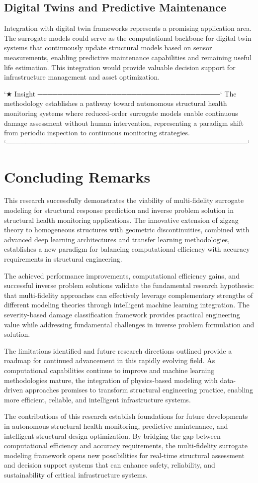 \subsection{Digital Twins and Predictive Maintenance}
Integration with digital twin frameworks represents a promising application area. The surrogate models could serve as the computational backbone for digital twin systems that continuously update structural models based on sensor measurements, enabling predictive maintenance capabilities and remaining useful life estimation. This integration would provide valuable decision support for infrastructure management and asset optimization.

`★ Insight ─────────────────────────────────────`
The methodology establishes a pathway toward autonomous structural health monitoring systems where reduced-order surrogate models enable continuous damage assessment without human intervention, representing a paradigm shift from periodic inspection to continuous monitoring strategies.
`─────────────────────────────────────────────────`

\section{Concluding Remarks}
This research successfully demonstrates the viability of multi-fidelity surrogate modeling for structural response prediction and inverse problem solution in structural health monitoring applications. The innovative extension of zigzag theory to homogeneous structures with geometric discontinuities, combined with advanced deep learning architectures and transfer learning methodologies, establishes a new paradigm for balancing computational efficiency with accuracy requirements in structural engineering.

The achieved performance improvements, computational efficiency gains, and successful inverse problem solutions validate the fundamental research hypothesis: that multi-fidelity approaches can effectively leverage complementary strengths of different modeling theories through intelligent machine learning integration. The severity-based damage classification framework provides practical engineering value while addressing fundamental challenges in inverse problem formulation and solution.

The limitations identified and future research directions outlined provide a roadmap for continued advancement in this rapidly evolving field. As computational capabilities continue to improve and machine learning methodologies mature, the integration of physics-based modeling with data-driven approaches promises to transform structural engineering practice, enabling more efficient, reliable, and intelligent infrastructure systems.

The contributions of this research establish foundations for future developments in autonomous structural health monitoring, predictive maintenance, and intelligent structural design optimization. By bridging the gap between computational efficiency and accuracy requirements, the multi-fidelity surrogate modeling framework opens new possibilities for real-time structural assessment and decision support systems that can enhance safety, reliability, and sustainability of critical infrastructure systems.